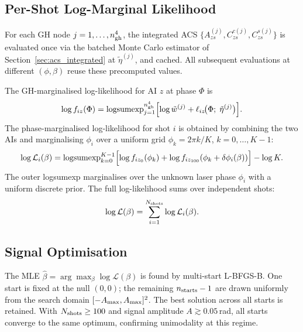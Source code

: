 \documentclass[11pt,a4paper]{article}
\begin{document}
\subsection{Per-Shot Log-Marginal Likelihood}
\label{sec:shot_logmarg}

For each GH node $j=1,\ldots,n_{\rm gh}^4$, the integrated ACS
$\{A^{(j)}_{zs},C^{c(j)}_{zs},C^{s(j)}_{zs}\}$ is evaluated once via the
batched Monte Carlo estimator of Section~\ref{sec:acs_integrated} at
$\tilde\eta^{(j)}$, and cached.  All subsequent evaluations at different
$(\phi,\beta)$ reuse these precomputed values.

The GH-marginalised log-likelihood for AI $z$ at phase $\Phi$ is
\begin{equation}
  \log f_{iz}(\Phi)
  =\operatorname{logsumexp}_{j=1}^{n_{\rm gh}^4}
    \Bigl[\log\tilde w^{(j)}+\ell_{iz}\!\bigl(\Phi;\;\tilde\eta^{(j)}\bigr)\Bigr].
  \label{eq:logf_iz}
\end{equation}
The phase-marginalised log-likelihood for shot $i$ is obtained by combining
the two AIs and marginalising $\phi_i$ over a uniform grid
$\phi_k=2\pi k/K$, $k=0,\ldots,K-1$:
\begin{equation}
  \log\mathcal{L}_i(\beta)
  =\operatorname{logsumexp}_{k=0}^{K-1}
    \Bigl[\log f_{iz_0}(\phi_k)
    +\log f_{iz_{100}}(\phi_k+\delta\phi_i(\beta))\Bigr]-\log K.
  \label{eq:logLi}
\end{equation}
The outer logsumexp marginalises over the unknown laser phase $\phi_i$ with a
uniform discrete prior.  The full log-likelihood sums over independent shots:
\begin{equation}
  \log\mathcal{L}(\beta)=\sum_{i=1}^{N_{\rm shots}}\log\mathcal{L}_i(\beta).
  \label{eq:logLfull_gh}
\end{equation}

\subsection{Signal Optimisation}
\label{sec:signal_opt_gh}

The MLE $\hat\beta=\arg\max_\beta\log\mathcal{L}(\beta)$ is found by
multi-start L-BFGS-B.  One start is fixed at the null $(0,0)$; the remaining
$n_{\rm starts}-1$ are drawn uniformly from the search domain
$[-A_{\rm max},A_{\rm max}]^2$.  The best solution across all starts is
retained.  With $N_{\rm shots}\ge100$ and signal amplitude
$A\gtrsim0.05$\,rad, all starts converge to the same optimum, confirming
unimodality at this regime.
\end{document}

